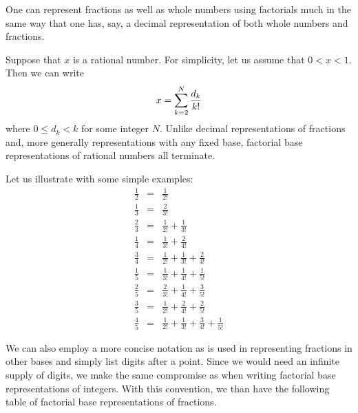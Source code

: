 \documentclass[12pt]{article}
\begin{document}
One can represent fractions as well as whole numbers using factorials
much in the same way that one has, say, a decimal representation of
both whole numbers and fractions.

Suppose that $x$ is a rational number.  For simplicity, let us assume
that $0 < x < 1$.  Then we can write
 \[x = \sum_{k=2}^N {d_k \over k!}\]
where $0 \le d_k < k$ for some integer $N$.  Unlike decimal representations
of fractions and, more generally representations with any fixed base,
factorial base representations of rational numbers all terminate.

Let us illustrate with some simple examples:
\begin{eqnarray*} 
\frac{1}{2} &=& \frac{1}{2!} \\
\frac{1}{3} &=& \frac{2}{3!} \\
\frac{2}{3} &=& \frac{1}{2!} + \frac{1}{3!} \\
\frac{1}{4} &=& \frac{1}{3!} + \frac{2}{4!} \\
\frac{3}{4} &=& \frac{1}{2!} + \frac{1}{3!} + \frac{2}{4!} \\
\frac{1}{5} &=& \frac{1}{3!} + \frac{1}{4!} + \frac{1}{5!} \\
\frac{2}{5} &=& \frac{2}{3!} + \frac{1}{4!} + \frac{3}{5!} \\
\frac{3}{5} &=& \frac{1}{2!} + \frac{2}{4!} + \frac{2}{5!} \\
\frac{4}{5} &=& \frac{1}{2!} + \frac{1}{3!} + \frac{3}{4!} +
\frac{1}{5!}
\end{eqnarray*}

We can also employ a more concise notation as is used in 
representing fractions in other bases and simply list
digits after a point.  Since we would need an infinite
supply of digits, we make the same compromise as when
writing factorial base representations of integers.  
With this convention, we than have the following table
of factorial base representations of fractions.
\end{document}
